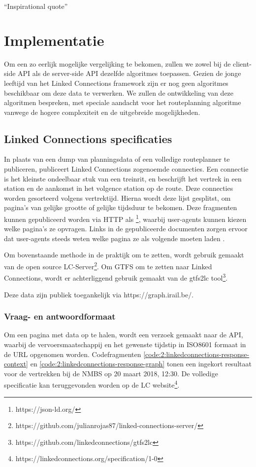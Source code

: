 \begin{savequote}[0.55\linewidth]
	``Inspirational quote''
\end{savequote}

\chapter{Implementatie}
\label{chap:implementatie}

Om een zo eerlijk mogelijke vergelijking te bekomen, zullen we zowel bij de client-side API als de server-side API dezelfde algoritmes toepassen. Gezien de jonge leeftijd van het Linked Connections framework zijn er nog geen algoritmes beschikbaar om deze data te verwerken. We zullen de ontwikkeling van deze algoritmen bespreken, met speciale aandacht voor het routeplanning algoritme vanwege de hogere complexiteit en de uitgebreide mogelijkheden.

\section{Linked Connections specificaties}
\label{sec:lcformaat}
In plaats van een dump van planningsdata of een volledige routeplanner te publiceren, publiceert Linked Connections zogenoemde connecties. Een connectie is het kleinste ondeelbaar stuk van een treinrit, en beschrijft het vertrek in een station en de aankomst in het volgence station op de route. Deze connecties worden gesorteerd volgens vertrektijd. Hierna wordt deze lijst gesplitst, om pagina's van gelijke grootte of gelijke tijdsduur te bekomen. Deze fragmenten kunnen gepubliceerd worden via HTTP als \footnote{https://json-ld.org/}, waarbij user-agents kunnen kiezen welke pagina's ze opvragen. Links in de gepubliceerde documenten zorgen ervoor dat user-agents steeds weten welke pagina ze als volgende moeten laden \citep{linkedconnections18}.

Om bovenstaande methode in de praktijk om te zetten, wordt gebruik gemaakt van de open source LC-Server\footnote{https://github.com/julianrojas87/linked-connections-server/}. Om GTFS om te zetten naar Linked Connections, wordt er achterliggend gebruik gemaakt van de gtfs2lc tool\footnote{https://github.com/linkedconnections/gtfs2lc}.

Deze data zijn publiek toegankelijk via https://graph.irail.be/.

\subsection{Vraag- en antwoordformaat}
Om een pagina met data op te halen, wordt een verzoek gemaakt naar de API, waarbij de vervoersmaatschappij en het gewenste tijdstip in ISO8601 formaat in de URL opgenomen worden.  Codefragmenten \ref{code:2:linkedconnections-response-context} en \ref{code:2:linkedconnections-response-graph} tonen een ingekort resultaat voor de vertrekken bij de NMBS op 20 maart 2018, 12:30. De volledige specificatie kan teruggevonden worden op de LC website\footnote{https://linkedconnections.org/specification/1-0}.

